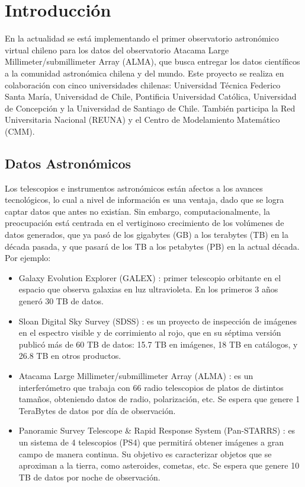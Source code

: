 \section{Introducción}

En la actualidad se está implementando el primer observatorio astronómico virtual chileno
para los datos del observatorio Atacama Large Millimeter/submillimeter Array (ALMA), que
busca entregar los datos científicos a la comunidad astronómica chilena y
del mundo. Este proyecto se realiza en colaboración con cinco universidades
chilenas: Universidad Técnica Federico Santa María, Universidad de Chile,
Pontificia Universidad Católica, Universidad de Concepción y la Universidad de
Santiago de Chile. También participa la Red Universitaria Nacional (REUNA) y el
Centro de Modelamiento Matemático (CMM).

\subsection{Datos Astronómicos}
Los telescopios e instrumentos astronómicos están afectos a los avances
tecnológicos, lo cual a nivel de información es una ventaja, dado que
se logra captar datos que antes no existían. Sin embargo, computacionalmente, la
preocupación está centrada en el vertiginoso crecimiento de los volúmenes de datos
generados, que ya pasó de los gigabytes (GB) a los terabytes (TB) en la década pasada, y
que pasará de los TB a los petabytes (PB) en la actual década. Por ejemplo:
\begin{itemize}
	\item Galaxy Evolution Explorer (GALEX) \cite{galex}: primer telescopio
orbitante en el espacio que observa galaxias en luz ultravioleta. En los primeros 3 años 
generó 30 TB de datos.
	\item Sloan Digital Sky Survey (SDSS) \cite{sloan}: es un proyecto de inspección de
imágenes en el espectro visible y de corrimiento al rojo, que en su séptima versión publicó más de 60 TB de datos:
15.7 TB en imágenes, 18 TB en catálogos, y 26.8 TB en otros productos.
	\item Atacama Large Millimeter/submillimeter Array (ALMA) \cite{alma}: es un
interferómetro que trabaja con 66 radio telescopios de platos de distintos
tamaños, obteniendo datos de radio, polarización, etc. Se espera que genere 1
TeraBytes de datos por día de observación.
	\item Panoramic Survey Telescope \& Rapid Response System (Pan-STARRS) \cite{pan}:
es un sistema de 4 telescopios (PS4) que permitirá obtener imágenes a gran campo de manera continua.
Su objetivo es caracterizar objetos que se aproximan a la tierra, como
asteroides, cometas, etc. Se espera que genere 10 TB de datos por noche de observación.
\end{itemize}


